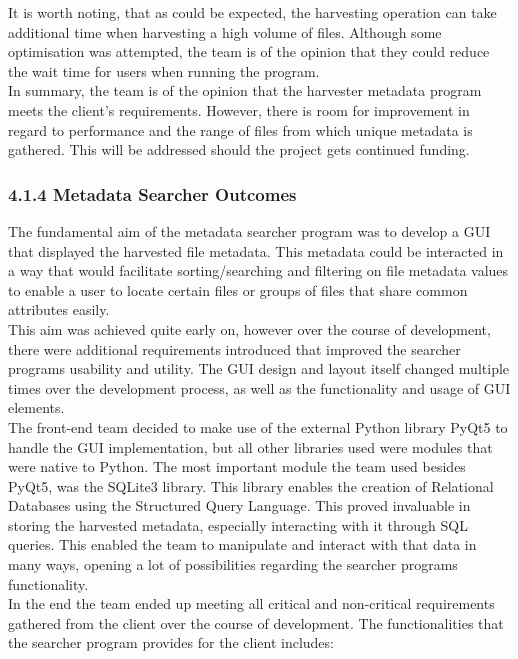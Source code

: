 \documentclass[11pt]{article}
\begin{document}
\begin{adjustwidth}{1cm}{}
It is worth noting, that as could be expected, the harvesting operation can take additional time when harvesting a high volume of files. Although some optimisation was attempted, the team is of the opinion that they could reduce the wait time for users when running the program. \\

In summary, the team is of the opinion that the harvester metadata program meets the client’s requirements. However, there is room for improvement in regard to performance and the range of files from which unique metadata is gathered. This will be addressed should the project gets continued funding.


\subsubsection{4.1.4 Metadata Searcher Outcomes}
The fundamental aim of the metadata searcher program was to develop a GUI that displayed the harvested file metadata. This metadata could be interacted in a way that would facilitate sorting/searching and filtering on file metadata values to enable a user to locate certain files or groups of files that share common attributes easily. \\

This aim was achieved quite early on, however over the course of development, there were additional requirements introduced that improved the searcher programs usability and utility. The GUI design and layout itself changed multiple times over the development process, as well as the functionality and usage of GUI elements. \\

The front-end team decided to make use of the external Python library PyQt5 to handle the GUI implementation, but all other libraries used were modules that were native to Python. The most important module the team used besides PyQt5, was the SQLite3 library. This library enables the creation of Relational Databases using the Structured Query Language. This proved invaluable in storing the harvested metadata, especially interacting with it through SQL queries. This enabled the team to manipulate and interact with that data in many ways, opening a lot of possibilities regarding the searcher programs functionality. \\

In the end the team ended up meeting all critical and non-critical requirements gathered from the client over the course of development. The functionalities that the searcher program provides for the client includes:


\end{adjustwidth}
\end{document}
